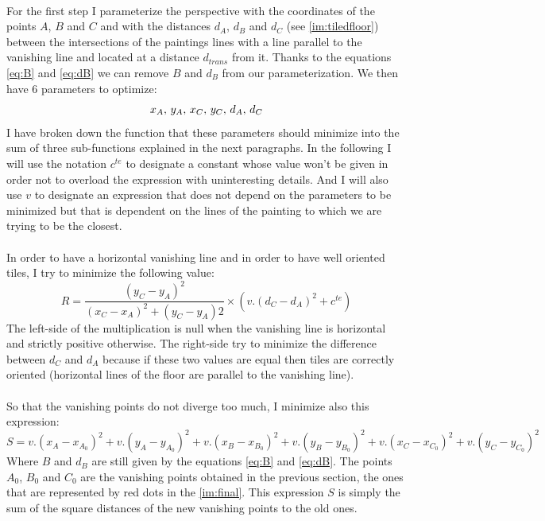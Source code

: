 \documentclass[11pt]{article}
\begin{document}
	\paragraph{}
	For the first step I parameterize the perspective with the coordinates of the points $A$, $B$ and $C$ and with the distances $d_A$, $d_B$ and $d_C$ (see \figurename \ref{im:tiledfloor}) between the intersections of the paintings lines with a line parallel to the vanishing line and located at a distance $d_{trans}$ from it. Thanks to the equations \eqref{eq:B} and \eqref{eq:dB} we can remove $B$ and $d_B$ from our parameterization. We then have 6 parameters to optimize:
	\vspace{-1mm} $$ x_A, \, y_A, \, x_C, \, y_C, \, d_A, \, d_C \vspace{-1mm} $$
	I have broken down the function that these parameters should minimize into the sum of three sub-functions explained in the next paragraphs. In the following I will use the notation $c^{te}$ to designate a constant whose value won't be given in order not to overload the expression with uninteresting details. And I will also use $v$ to designate an expression that does not depend on the parameters to be minimized but that is dependent on the lines of the painting to which we are trying to be the closest.
	
	\paragraph{}
	In order to have a horizontal vanishing line and in order to have well oriented tiles, I try to minimize the following value:
	\begin{equation}
		\label{eq:R}
		R = \dfrac{(y_C - y_A)^2}{(x_C - x_A)^2 + (y_C - y_A)2} \times \left( v . (d_C - d_A)^2 + c^{te} \right)
	\end{equation}
	The left-side of the multiplication is null when the vanishing line is horizontal and strictly positive otherwise. The right-side try to minimize the difference between $d_C$ and $d_A$ because if these two values are equal then tiles are correctly oriented (horizontal lines of the floor are parallel to the vanishing line).
	
	\paragraph{}
	So that the vanishing points do not diverge too much, I minimize also this expression:
	\begin{equation}
		\label{eq:S}
		S = v . (x_A - x_{A_0})^2 + v . (y_A - y_{A_0})^2 + v . (x_B - x_{B_0})^2 + v . (y_B - y_{B_0})^2 + v . (x_C - x_{C_0})^2 + v . (y_C - y_{C_0})^2
	\end{equation}
	Where $B$ and $d_B$ are still given by the equations \eqref{eq:B} and \eqref{eq:dB}. The points $A_0$, $B_0$ and $C_0$ are the vanishing points obtained in the previous section, the ones that are represented by red dots in the \figurename \ref{im:final}. This expression $S$ is simply the sum of the square distances of the new vanishing points to the old ones.
	
\end{document}
